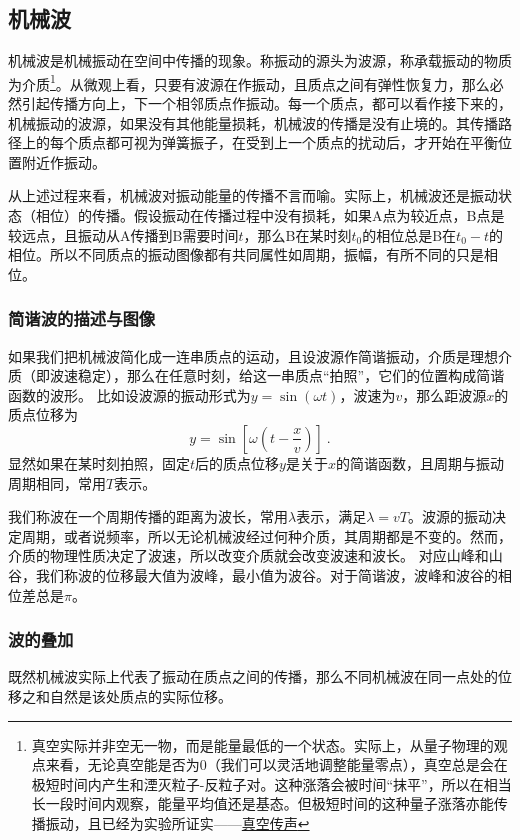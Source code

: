 
\subsection{机械波}
机械波是机械振动在空间中传播的现象。称振动的源头为波源，称承载振动的物质为介质\footnote{真空实际并非空无一物，而是能量最低的一个状态。实际上，从量子物理的观点来看，无论真空能是否为0（我们可以灵活地调整能量零点），真空总是会在极短时间内产生和湮灭粒子-反粒子对。这种涨落会被时间“抹平”，所以在相当长一段时间内观察，能量平均值还是基态。但极短时间的这种量子涨落亦能传播振动，且已经为实验所证实——\href{https://www.rmzxw.com.cn/c/2023-08-25/3399291.shtml}{真空传声}}。从微观上看，只要有波源在作振动，且质点之间有弹性恢复力，那么必然引起传播方向上，下一个相邻质点作振动。每一个质点，都可以看作接下来的，机械振动的波源，如果没有其他能量损耗，机械波的传播是没有止境的。其传播路径上的每个质点都可视为弹簧振子，在受到上一个质点的扰动后，才开始在平衡位置附近作振动。

从上述过程来看，机械波对振动能量的传播不言而喻。实际上，机械波还是振动状态（相位）的传播。假设振动在传播过程中没有损耗，如果A点为较近点，B点是较远点，且振动从A传播到B需要时间$t$，那么B在某时刻$t_0$的相位总是B在$t_0-t$的相位。所以不同质点的振动图像都有共同属性如周期，振幅，有所不同的只是相位。
\subsubsection{简谐波的描述与图像}
如果我们把机械波简化成一连串质点的运动，且设波源作简谐振动，介质是理想介质（即波速稳定），那么在任意时刻，给这一串质点“拍照”，它们的位置构成简谐函数的波形。
比如设波源的振动形式为$y=\sin(\omega t)$，波速为$v$，那么距波源$x$的质点位移为
\begin{equation}
y=\sin [\omega (t-\frac{x}{v})]~.
\end{equation}
显然如果在某时刻拍照，固定$t$后的质点位移$y$是关于$x$的简谐函数，且周期与振动周期相同，常用$T$表示。%

我们称波在一个周期传播的距离为波长，常用$\lambda $表示，满足$\lambda=vT$。波源的振动决定周期，或者说频率，所以无论机械波经过何种介质，其周期都是不变的。然而，介质的物理性质决定了波速，所以改变介质就会改变波速和波长。
对应山峰和山谷，我们称波的位移最大值为波峰，最小值为波谷。对于简谐波，波峰和波谷的相位差总是$\pi$。

\subsubsection{波的叠加}
既然机械波实际上代表了振动在质点之间的传播，那么不同机械波在同一点处的位移之和自然是该处质点的实际位移。
